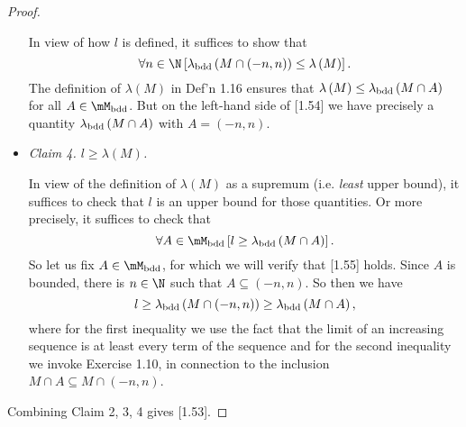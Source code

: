 \documentclass[pmath450]{subfiles}
\begin{document}
\begin{proof}
\begin{itemize}
                \begin{subproof}
                    In view of how $l$ is defined, it suffices to show that
                    \begin{equation}
                        \forall n\in\N\left[ \lambda_{\bdd}\left( M\cap\left( -n,n \right) \right)\leq\lambda\left( M \right) \right].
                    \end{equation}
                    The definition of $\lambda\left( M \right)$ in Def'n 1.16 ensures that $\lambda\left( M \right)\leq\lambda_{\operatorname{bdd}}\left( M\cap A \right)$ for all $A\in\mM_{\bdd}$. But on the left-hand side of [1.54] we have precisely a quantity $\lambda_{\operatorname{bdd}}\left( M\cap A \right)$ with $A=\left( -n,n \right)$.
                \end{subproof}

            \item \textit{Claim 4. $l\geq\lambda\left( M \right)$.}

                \begin{subproof}
                    In view of the definition of $\lambda\left( M \right)$ as a supremum (i.e. \textit{least} upper bound), it suffices to check that $l$ is an upper bound for those quantities. Or more precisely, it suffices to check that
                    \begin{equation}
                        \forall A\in\mM_{\bdd}\left[ l\geq\lambda_{\bdd}\left( M\cap A \right) \right].
                    \end{equation}
                    So let us fix $A\in\mM_{\bdd}$, for which we will verify that [1.55] holds. Since $A$ is bounded, there is $n\in\N$ such that $A\subseteq\left( -n,n \right)$. So then we have
                    \begin{equation*}
                        l\geq\lambda_{\operatorname{bdd}}\left( M\cap\left( -n,n \right) \right)\geq\lambda_{\operatorname{bdd}}\left( M\cap A \right),
                    \end{equation*}
                    where for the first inequality we use the fact that the limit of an increasing sequence is at least every term of the sequence and for the second inequality we invoke Exercise 1.10, in connection to the inclusion $M\cap A\subseteq M\cap\left( -n,n \right)$.
                \end{subproof}
        \end{itemize} 
        Combining Claim 2, 3, 4 gives [1.53].
    \end{proof}
\end{document}
